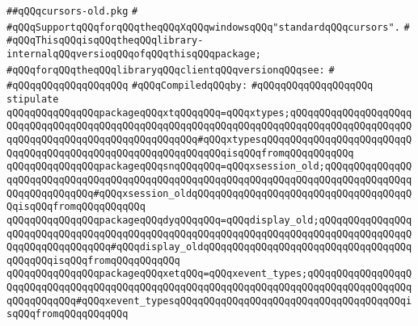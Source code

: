 \label{src/lib/x-kit/xclient/src/window/cursors-old.pkg}
\verb|##qQQqcursors-old.pkg|\newline
\verb|#|\newline
\verb|#qQQqSupportqQQqforqQQqtheqQQqXqQQqwindowsqQQq"standardqQQqcursors".|\newline
\verb|#|\newline
\verb|#qQQqThisqQQqisqQQqtheqQQqlibrary-internalqQQqversioqQQqofqQQqthisqQQqpackage;|\newline
\verb|#qQQqforqQQqtheqQQqlibraryqQQqclientqQQqversionqQQqsee:|\newline
\verb|#|\newline
\verb|#qQQqqQQqqQQqqQQqqQQq|\newline
\newline
\verb|#qQQqCompiledqQQqby:|\newline
\verb|#qQQqqQQqqQQqqQQqqQQq|\newline
\newline
\newline
\verb|stipulate|\newline
\verb|qQQqqQQqqQQqqQQqpackageqQQqxtqQQqqQQq=qQQqxtypes;qQQqqQQqqQQqqQQqqQQqqQQqqQQqqQQqqQQqqQQqqQQqqQQqqQQqqQQqqQQqqQQqqQQqqQQqqQQqqQQqqQQqqQQqqQQqqQQqqQQqqQQqqQQqqQQqqQQqqQQqqQQq#qQQqxtypesqQQqqQQqqQQqqQQqqQQqqQQqqQQqqQQqqQQqqQQqqQQqqQQqqQQqqQQqqQQqqQQqisqQQqfromqQQqqQQqqQQq|\newline
\verb|qQQqqQQqqQQqqQQqpackageqQQqsnqQQqqQQq=qQQqxsession_old;qQQqqQQqqQQqqQQqqQQqqQQqqQQqqQQqqQQqqQQqqQQqqQQqqQQqqQQqqQQqqQQqqQQqqQQqqQQqqQQqqQQqqQQqqQQqqQQqqQQq#qQQqxsession_oldqQQqqQQqqQQqqQQqqQQqqQQqqQQqqQQqqQQqqQQqisqQQqfromqQQqqQQqqQQq|\newline
\verb|qQQqqQQqqQQqqQQqpackageqQQqdyqQQqqQQq=qQQqdisplay_old;qQQqqQQqqQQqqQQqqQQqqQQqqQQqqQQqqQQqqQQqqQQqqQQqqQQqqQQqqQQqqQQqqQQqqQQqqQQqqQQqqQQqqQQqqQQqqQQqqQQqqQQq#qQQqdisplay_oldqQQqqQQqqQQqqQQqqQQqqQQqqQQqqQQqqQQqqQQqqQQqisqQQqfromqQQqqQQqqQQq|\newline
\verb|qQQqqQQqqQQqqQQqpackageqQQqxetqQQq=qQQqxevent_types;qQQqqQQqqQQqqQQqqQQqqQQqqQQqqQQqqQQqqQQqqQQqqQQqqQQqqQQqqQQqqQQqqQQqqQQqqQQqqQQqqQQqqQQqqQQqqQQqqQQq#qQQqxevent_typesqQQqqQQqqQQqqQQqqQQqqQQqqQQqqQQqqQQqqQQqisqQQqfromqQQqqQQqqQQq|\newline
